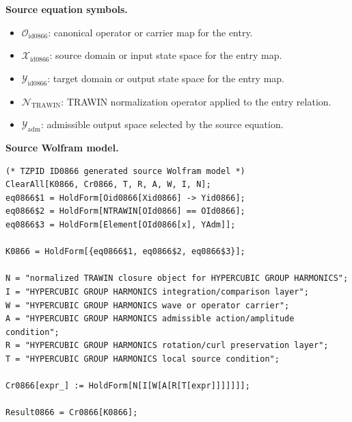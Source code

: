 \begin{minipage}[t]{0.49\linewidth}
\begingroup
\small
\raggedright
\textbf{Source equation symbols.}\par
\begin{itemize}[leftmargin=1.35em,itemsep=1pt,topsep=1pt,parsep=0pt]
    \item $\mathcal{O}_{\mathrm{id0866}}$: canonical operator or carrier map for the entry.
    \item $\mathcal{X}_{\mathrm{id0866}}$: source domain or input state space for the entry map.
    \item $\mathcal{Y}_{\mathrm{id0866}}$: target domain or output state space for the entry map.
    \item $\mathcal{N}_{\mathrm{TRAWIN}}$: TRAWIN normalization operator applied to the entry relation.
    \item $\mathcal{Y}_{\mathrm{adm}}$: admissible output space selected by the source equation.
\end{itemize}
\endgroup
\end{minipage}\hfill
\begin{minipage}[t]{0.47\linewidth}
\begingroup
\scriptsize
\raggedright
\textbf{Source Wolfram model.}\par
\begin{Verbatim}[fontsize=\tiny,breaklines=true,breakanywhere=true]
(* TZPID ID0866 generated source Wolfram model *)
ClearAll[K0866, Cr0866, T, R, A, W, I, N];
eq0866$1 = HoldForm[Oid0866[Xid0866] -> Yid0866];
eq0866$2 = HoldForm[NTRAWIN[OId0866] == OId0866];
eq0866$3 = HoldForm[Element[OId0866[x], YAdm]];

K0866 = HoldForm[{eq0866$1, eq0866$2, eq0866$3}];

N = "normalized TRAWIN closure object for HYPERCUBIC GROUP HARMONICS";
I = "HYPERCUBIC GROUP HARMONICS integration/comparison layer";
W = "HYPERCUBIC GROUP HARMONICS wave or operator carrier";
A = "HYPERCUBIC GROUP HARMONICS admissible action/amplitude condition";
R = "HYPERCUBIC GROUP HARMONICS rotation/curl preservation layer";
T = "HYPERCUBIC GROUP HARMONICS local source condition";

Cr0866[expr_] := HoldForm[N[I[W[A[R[T[expr]]]]]]];

Result0866 = Cr0866[K0866];
\end{Verbatim}
\endgroup
\end{minipage}

